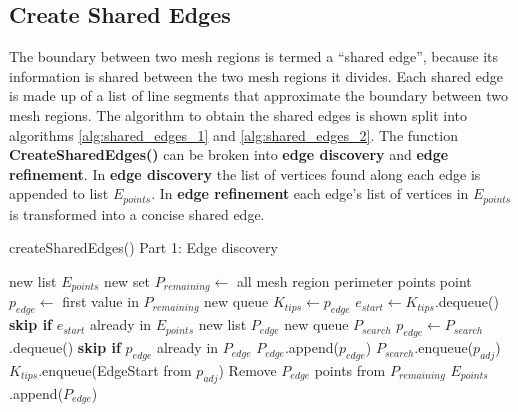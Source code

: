 \subsection{Create Shared Edges}
The boundary between two mesh regions is termed a ``shared edge'', because its information is shared between the two mesh regions it divides.
Each shared edge is made up of a list of line segments that approximate the boundary between two mesh regions.
The algorithm to obtain the shared edges is shown split into algorithms \ref{alg:shared_edges_1} and \ref{alg:shared_edges_2}.
The function \textbf{CreateSharedEdges()} can be broken into \textbf{edge discovery} and \textbf{edge refinement}.
In \textbf{edge discovery} the list of vertices found along each edge is appended to list $E_{points}$.
In \textbf{edge refinement} each edge's list of vertices in $E_{points}$ is transformed into a concise shared edge.

\begin{algorithm}[!htb]
	\caption{createSharedEdges() Part 1: Edge discovery}\label{alg:shared_edges_1}
\begin{algorithmic}[1]
	\State new list $E_{points}$ 
	\State new set $P_{remaining} \leftarrow$ all mesh region perimeter points
	\label{alg:shared_edges:while_k_remaining}
		\State point $p_{edge} \leftarrow$ first value in $P_{remaining}$
		\State new queue $K_{tips} \leftarrow p_{edge}$ 
		\label{alg:shared_edges:while_k_tips}
			\State $e_{start} \leftarrow K_{tips}$.dequeue()
			\State \textbf{skip if} $e_{start}$ already in $E_{points}$
			\State new list $P_{edge}$ 
			\State new queue $P_{search}$ 
				\State $p_{edge} \leftarrow P_{search}$.dequeue()
				\State \textbf{skip if} $p_{edge}$ already in $P_{edge}$
				\State $P_{edge}$.append($p_{edge}$)
						\State $P_{search}$.enqueue($p_{adj}$)
					\EndIf
						\State $K_{tips}$.enqueue(EdgeStart from $p_{adj}$)
					\EndIf
				\EndFor
			\EndWhile
			\State Remove $P_{edge}$ points from $P_{remaining}$
			\State $E_{points}$.append($P_{edge}$)
		\EndWhile
	\EndWhile
\end{algorithmic}
\end{algorithm}

